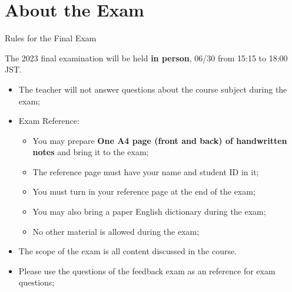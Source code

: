 \section{About the Exam}

\begin{frame}[t]{Rules for the Final Exam}

  The 2023 final examination will be held {\bf in person}, 06/30 from 15:15 to 18:00 JST.

  \begin{itemize}
    \item The teacher will not answer questions about the course subject during the exam;\vfill

    \item Exam Reference: 
    \begin{itemize}
    \item You may prepare {\bf One A4 page (front and back) of
        handwritten notes} and bring it to the exam;
    \item The reference page must have your name and student ID in it;
    \item You must turn in your reference page at the end of the exam;
    \item You may also bring a paper English dictionary during the exam;
    \item \alert{No other material} is allowed during the exam;
    \end{itemize}\vfill
  \item The scope of the exam is all content discussed in the course.
  \item Please use the questions of the feedback exam as an reference
    for exam questions;
  \end{itemize}
\end{frame}
  


